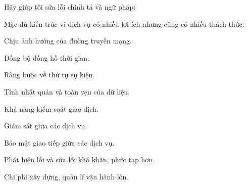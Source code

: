 Hãy giúp tôi sửa lỗi chính tả và ngữ pháp:

Mặc dù kiến trúc vi dịch vụ có nhiều lợi ích nhưng cũng có nhiều thách thức:

Chịu ảnh hưởng của đường truyền mạng.

Đồng bộ đồng hồ thời gian.

Ràng buộc về thứ tự sự kiện.

Tính nhất quán và toàn vẹn của dữ liệu.

Khả năng kiểm soát giao dịch.

Giám sát giữa các dịch vụ.

Bảo mật giao tiếp giữa các dịch vụ.

Phát hiện lỗi và sửa lỗi khó khăn, phức tạp hơn.

Chi phí xây dựng, quản lí vận hành lớn.

